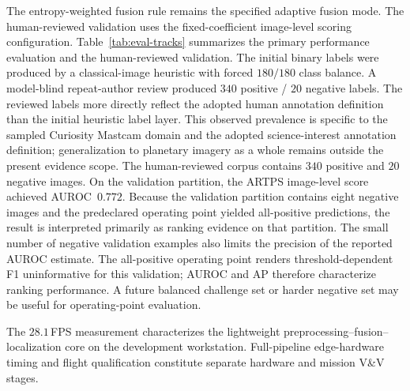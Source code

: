 The entropy-weighted fusion rule remains the specified adaptive fusion mode.
The human-reviewed validation uses the fixed-coefficient image-level scoring configuration.
Table~\ref{tab:eval-tracks} summarizes the primary performance evaluation and the
human-reviewed validation.
The initial binary labels were produced by a classical-image heuristic with forced $180/180$
class balance.
A model-blind repeat-author review produced $340$ positive / $20$ negative labels.
The reviewed labels more directly reflect the adopted human annotation definition than the
initial heuristic label layer.
This observed prevalence is specific to the sampled Curiosity Mastcam domain and the
adopted science-interest annotation definition; generalization to planetary imagery as a
whole remains outside the present evidence scope.
The human-reviewed corpus contains $340$ positive and $20$ negative images.
On the validation partition, the ARTPS image-level score achieved AUROC~$0.772$.
Because the validation partition contains eight negative images and the predeclared
operating point yielded all-positive predictions, the result is interpreted primarily as
ranking evidence on that partition.
The small number of negative validation examples also limits the precision of the reported
AUROC estimate.
The all-positive operating point renders threshold-dependent F1 uninformative for this
validation; AUROC and AP therefore characterize ranking performance.
A future balanced challenge set or harder negative set may be useful for operating-point
evaluation.

The $28.1$\,FPS measurement characterizes the lightweight preprocessing--fusion--localization
core on the development workstation.
Full-pipeline edge-hardware timing and flight qualification constitute separate hardware and
mission V\&V stages.
